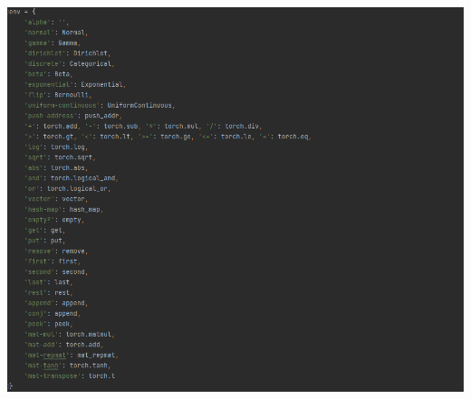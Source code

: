 \documentclass[10pt]{homeworg}
\begin{document}
\begin{center}
\includegraphics[scale=0.5]{../figures/primitive.png}
\end{center}

\newpage
\end{document}
